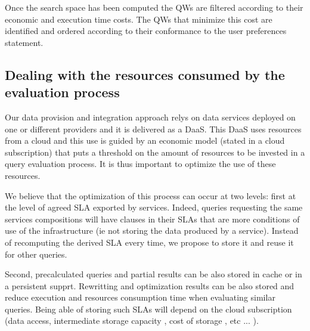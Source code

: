     Once the search space has been computed the QWs are filtered according to their economic and execution time costs. The QWs that minimize this cost are identified and ordered according to their conformance to the user preferences statement.

 
\subsection{Dealing with the resources consumed by the evaluation process}
\label{sec:queryProcessOpt}
  
 
 Our data provision and integration approach relys on data services deployed on one or different providers and it is delivered as a DaaS. This DaaS  uses resources from a cloud and this use  is  guided by an economic model (stated in a cloud subscription) that puts a threshold on the amount of resources to be invested in a query evaluation process. It is thus important to optimize the use of these resources.
 
 We believe that the optimization of this process can occur at two levels: first at the level of agreed SLA exported by services.  Indeed, queries requesting the same services compositions will have clauses in their SLAs that are more conditions of use of the infrastructure (ie not storing the data produced by a service). Instead of recomputing the derived SLA every time, we propose to store it and reuse it for other queries. 
 
Second, precalculated queries and partial results can be also stored in cache or in a persistent supprt. Rewritting and optimization results can be also stored and reduce execution and resources consumption time when evaluating similar queries. Being able of storing such SLAs will depend on the cloud subscription (data access, intermediate storage capacity , cost of storage , etc ... ).

